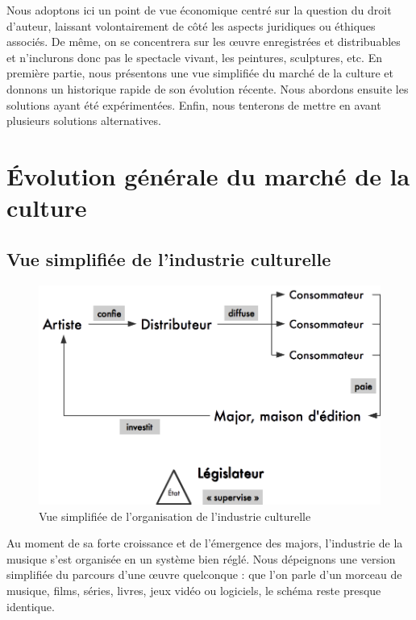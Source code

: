 \documentclass[a4paper]{report}
\begin{document}
	Nous adoptons ici un point de vue économique centré sur la question du droit d'auteur, laissant volontairement de côté les aspects juridiques ou éthiques associés. De même, on se concentrera sur les œuvre enregistrées et distribuables et n'inclurons donc pas le spectacle vivant, les peintures, sculptures, etc. En première partie, nous présentons une vue simplifiée du marché de la culture et donnons un historique rapide de son évolution récente. Nous abordons ensuite les solutions ayant été expérimentées. Enfin, nous tenterons de mettre en avant plusieurs solutions alternatives.





	\chapter{Évolution générale du marché de la culture}
	
	\section{Vue simplifiée de l'industrie culturelle}

	\begin{figure}[ht]
		\includegraphics[width=13cm]{images/organisation-industrie-culturelle.png}
		\caption{Vue simplifiée de l'organisation de l'industrie culturelle}
	\end{figure}

	Au moment de sa forte croissance et de l'émergence des majors, l'industrie de la musique s'est organisée en un système bien réglé. Nous dépeignons une version simplifiée du parcours d'une œuvre quelconque : que l'on parle d'un morceau de musique, films, séries, livres, jeux vidéo ou logiciels, le schéma reste presque identique.\\
\end{document}
